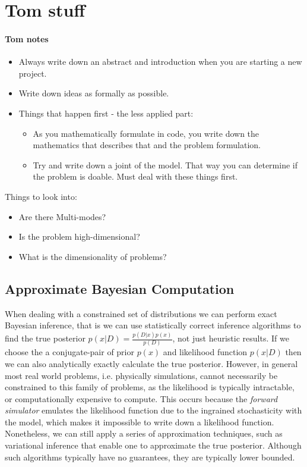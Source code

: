 \documentclass[]{scrartcl}
\begin{document}
\section{Tom stuff}

\paragraph*{Tom notes}

\begin{itemize}
	\item Always write down an abstract and introduction when you are starting a new project. 
	\item Write down ideas as formally as possible. 
	\item Things that happen first - the less applied part: 
	\begin{itemize}
		\item As you mathematically formulate in code, you write down the mathematics that describes that and the problem formulation. 
         \item Try and write down a joint of the model. That way you can determine if the problem is doable. Must deal with these things first. 
\end{itemize}
\end{itemize}

Things to look into:

\begin{itemize}
\item Are there Multi-modes?
\item Is the problem high-dimensional?
\item What is the dimensionality of problems?
\end{itemize}


\subsection{Approximate Bayesian Computation}

When dealing with a constrained set of distributions we can perform exact Bayesian inference, that is we can use statistically correct inference algorithms to find the true posterior $p(x | D) = \frac{p(D|x)p(x)}{p(D)}$, not just heuristic results. If we choose the a conjugate-pair of prior $p(x)$ and likelihood function $p(x|D)$ then we can also analytically exactly calculate the true posterior. However, in general most real world problems, i.e. physically simulations, cannot necessarily be constrained to this family of problems, as the likelihood is typically intractable, or computationally expensive to compute. This occurs because the \textit{forward simulator} emulates the likelihood function
due to the ingrained stochasticity with the model, which makes it impossible to write down a likelihood function. Nonetheless, we can still apply a series of approximation techniques, such as variational inference that enable one to approximate the true posterior. Although such algorithms typically have no guarantees, they are typically lower bounded.   
\end{document}
